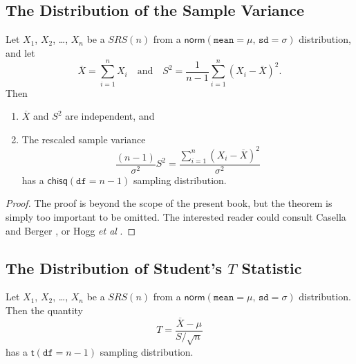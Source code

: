 \documentclass[captions=tableheading]{scrbook}
\begin{document}
\subsection{The Distribution of the Sample Variance}
\label{sec-8-2-2}
\label{sub-Samp-Var-Dist}


\begin{thm}
Let \(X_{1}\), \(X_{2}\), \ldots{}, \(X_{n}\) be a \(SRS(n)\) from a \(\mathsf{norm}(\mathtt{mean}=\mu,\,\mathtt{sd}=\sigma)\) distribution, and let
\begin{equation}
\overline{X}=\sum_{i=1}^{n}X_{i}\quad\mbox{and}\quad S^{2}=\frac{1}{n-1}\sum_{i=1}^{n}(X_{i}-\overline{X})^{2}.
\end{equation}
Then
\begin{enumerate}
\item \(\overline{X}\) and \(S^{2}\) are independent, and
\item The rescaled sample variance
    \begin{equation}
    \frac{(n-1)}{\sigma^{2}}S^{2}=\frac{\sum_{i=1}^{n}(X_{i}-\overline{X})^{2}}{\sigma^{2}}
    \end{equation}
    has a \(\mathsf{chisq}(\mathtt{df}=n-1)\) sampling distribution.
\end{enumerate}

\end{thm}

\begin{proof}
The proof is beyond the scope of the present book, but the theorem is simply too important to be omitted. The interested reader could consult Casella and Berger \cite{Casella2002}, or Hogg \emph{et al} \cite{Hogg2005}. 
\end{proof}
\subsection{The Distribution of Student's \(T\) Statistic}
\label{sec-8-2-3}
\label{sub-Student's-t-Distribution}


\begin{prop}
Let \(X_{1}\), \(X_{2}\), \ldots{}, \(X_{n}\) be a \(SRS(n)\) from a \(\mathsf{norm}(\mathtt{mean}=\mu,\,\mathtt{sd}=\sigma)\) distribution. Then the quantity 
\begin{equation}
T=\frac{\overline{X}-\mu}{S/\sqrt{n}}
\end{equation}
has a \(\mathsf{t}(\mathtt{df}=n-1)\) sampling distribution.
\end{prop}
\end{document}
